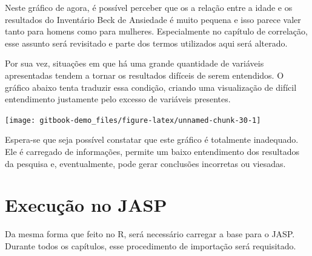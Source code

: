\documentclass[
]{book}
\newenvironment{Shaded}{\begin{snugshade}}{\end{snugshade}}
\newcommand{\DataTypeTok}[1]{\textcolor[rgb]{0.13,0.29,0.53}{#1}}
\newcommand{\KeywordTok}[1]{\textcolor[rgb]{0.13,0.29,0.53}{\textbf{#1}}}
\newcommand{\NormalTok}[1]{#1}
\newcommand{\OperatorTok}[1]{\textcolor[rgb]{0.81,0.36,0.00}{\textbf{#1}}}
\newcommand{\StringTok}[1]{\textcolor[rgb]{0.31,0.60,0.02}{#1}}
\begin{document}
Neste gráfico de agora, é possível perceber que os a relação entre a idade e os resultados do Inventário Beck de Ansiedade é muito pequena e isso parece valer tanto para homens como para mulheres. Especialmente no capítulo de correlação, esse assunto será revisitado e parte dos termos utilizados aqui será alterado.

Por sua vez, situações em que há uma grande quantidade de variáveis apresentadas tendem a tornar os resultados difíceis de serem entendidos. O gráfico abaixo tenta traduzir essa condição, criando uma visualização de difícil entendimento justamente pelo excesso de variáveis presentes.

\begin{Shaded}
\end{Shaded}

\begin{center}\texttt{[image: gitbook-demo\_files/figure-latex/unnamed-chunk-30-1]} \end{center}

Espera-se que seja possível constatar que este gráfico é totalmente inadequado. Ele é carregado de informações, permite um baixo entendimento dos resultados da pesquisa e, eventualmente, pode gerar conclusões incorretas ou viesadas.

\hypertarget{execuuxe7uxe3o-no-jasp}{%
\section{Execução no JASP}\label{execuuxe7uxe3o-no-jasp}}

Da mesma forma que feito no R, será necessário carregar a base para o JASP. Durante todos os capítulos, esse procedimento de importação será requisitado.
\end{document}
